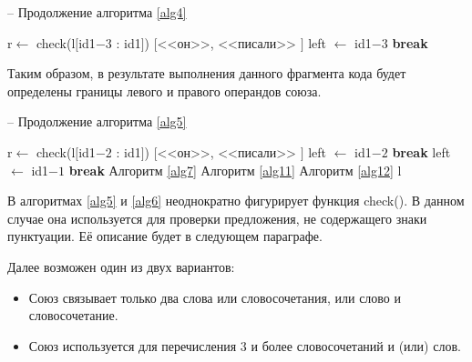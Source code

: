 \documentclass[main]{subfiles}
\begin{document}
\begin{algorithm}[!h]
	\caption{-- Продолжение алгоритма \ref{alg4}}\label{alg5}
	\begin{algorithmic}[1]
		\EndIf
		\State r$\gets$ check(l$[$id1$-3$ : id1$]$)
\State \Return $[$<<он>>, <<писали>> $]$
\State left $\gets$ id1$-3$ 
\State \textbf{break}
\EndIf
\EndIf
\EndFor
		\EndIf
	\end{algorithmic}
\end{algorithm}
Таким образом, в результате выполнения данного фрагмента кода будет определены границы левого и правого операндов союза.
\begin{algorithm}[!h]
	\caption{-- Продолжение алгоритма \ref{alg5}}\label{alg6}
	\begin{algorithmic}[1]
		\State r$\gets$ check(l$[$id1$-2$ : id1$]$)
		\State \Return $[$<<он>>, <<писали>> $]$
		\State left $\gets$ id1$-2$ 
		\State \textbf{break}
		\EndIf
		\EndIf
		\EndFor
		\EndIf
		\State left $\gets$ id1$-1$
		\State \textbf{break}
		\EndIf
		\EndFor
		\EndIf
		\EndIf
		\State Алгоритм \ref{alg7}
		\State Алгоритм \ref{alg11}
		\State Алгоритм \ref{alg12}
		\State \Return l
		\EndFunction
	\end{algorithmic}
\end{algorithm}

В алгоритмах \ref{alg5} и \ref{alg6} неоднократно фигурирует функция check(). В данном случае она используется для проверки предложения, не содержащего знаки пунктуации. Её описание будет в следующем параграфе.

Далее возможен один из двух вариантов:
\begin{itemize}
	\item Союз связывает только два слова или словосочетания, или слово и словосочетание.
	\item Союз используется для перечисления $3$ и более словосочетаний и (или) слов.
\end{itemize}
\end{document}
